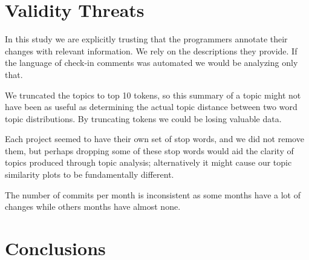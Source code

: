 \documentclass[times, 10pt,twocolumn]{article}
\newcommand{\shrinkit}{\vspace*{-.3em}}
\begin{document}


\shrinkit
\section{Validity Threats}
\shrinkit

In this study we are explicitly trusting that the programmers annotate
their changes with relevant information. We rely on the descriptions
they provide. If the language of check-in comments was automated we
would  be analyzing only that.

We truncated the topics to top 10 tokens, so this summary of a topic
might not have been as useful as determining the actual topic distance
between two word topic distributions. By truncating tokens we could be
losing valuable data.

Each project seemed to have their own set of stop words, and we did not
remove them, but perhaps dropping some of these stop words would aid
the clarity of topics produced through topic analysis; alternatively
it might cause our topic similarity plots to be fundamentally
different.

The number of commits per month is inconsistent as some months have a
lot of changes while others months have almost none.




\shrinkit
\section{Conclusions}
\shrinkit





\end{document}
